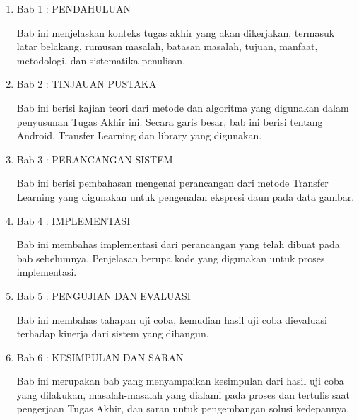 \begin{enumerate}
\item Bab 1 : PENDAHULUAN

Bab ini menjelaskan konteks tugas akhir yang akan dikerjakan, termasuk latar belakang, rumusan masalah, batasan masalah, tujuan, manfaat, metodologi, dan sistematika penulisan.

\item Bab 2 : TINJAUAN PUSTAKA

Bab ini berisi kajian teori dari metode dan algoritma yang digunakan dalam penyusunan Tugas Akhir ini. Secara garis besar, bab ini berisi tentang Android, Transfer Learning dan library yang digunakan.

\item Bab 3 :  PERANCANGAN SISTEM

Bab ini berisi pembahasan mengenai perancangan dari metode Transfer Learning yang digunakan untuk pengenalan ekspresi daun pada data gambar.

\item Bab 4 : IMPLEMENTASI

Bab ini membahas implementasi dari perancangan yang telah dibuat pada bab sebelumnya. Penjelasan berupa kode yang digunakan untuk proses implementasi.

\item Bab 5 : PENGUJIAN DAN EVALUASI

Bab ini membahas tahapan uji coba, kemudian hasil uji coba dievaluasi terhadap kinerja dari sistem yang dibangun.

\item Bab 6 : KESIMPULAN DAN SARAN

Bab ini merupakan bab yang menyampaikan kesimpulan dari hasil uji coba yang dilakukan, masalah-masalah yang dialami pada proses dan tertulis saat pengerjaan Tugas Akhir, dan saran untuk  pengembangan solusi kedepannya.

\end{enumerate}